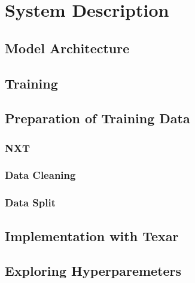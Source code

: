 \chapter{System Description}\label{ch:system-description}

\Blindtext


\section{Model Architecture}

\Blindtext


\section{Training}\label{sec:system-description-training}

\Blindtext


\section{Preparation of Training Data}

\Blindtext

\subsection{NXT}

\Blindtext

\subsection{Data Cleaning}

\Blindtext

\subsection{Data Split}

\Blindtext


\section{Implementation with Texar}

\Blindtext


\section{Exploring Hyperparemeters}

\Blindtext